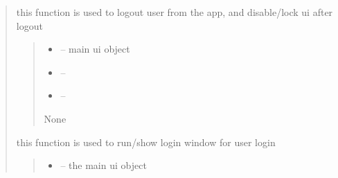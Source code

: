 \documentclass[letterpaper,10pt,english]{sphinxmanual}
\begin{document}
\begin{quote}
\begin{savenotes}\begin{fulllineitems}
\label{\detokenize{setting/backend/user_login_logout_funcs:oxin.backend.user_login_logout_funcs.logout_user}}
\pysigstartsignatures
{}
\pysigstopsignatures
\sphinxAtStartPar
this function is used to logout user from the app, and disable/lock ui after logout
\begin{quote}\begin{description}
\begin{itemize}
\item {} 
\sphinxAtStartPar
{} – main ui object

\item {} 
\sphinxAtStartPar
{} – 

\item {} 
\sphinxAtStartPar
{} – 

\end{itemize}

\sphinxAtStartPar
None

\end{description}\end{quote}

\end{fulllineitems}\end{savenotes}


\begin{savenotes}\begin{fulllineitems}
\label{\detokenize{setting/backend/user_login_logout_funcs:oxin.backend.user_login_logout_funcs.run_login_window}}
\pysigstartsignatures
{}
\pysigstopsignatures
\sphinxAtStartPar
this function is used to run/show login window for user login
\begin{quote}\begin{description}
\begin{itemize}
\item {} 
\sphinxAtStartPar
{} – the main ui object


\end{itemize}
\end{description}
\end{quote}
\end{fulllineitems}
\end{savenotes}
\end{quote}
\end{document}
